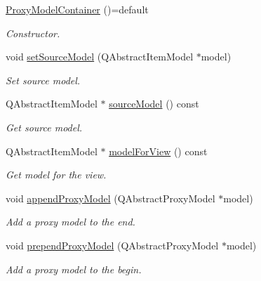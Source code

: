 \begin{DoxyCompactItemize}
\item 
\hyperlink{class_mdt_1_1_item_model_1_1_proxy_model_container_acef8f95b42382752a454b607bcf6d9b0}{Proxy\+Model\+Container} ()=default\hypertarget{class_mdt_1_1_item_model_1_1_proxy_model_container_acef8f95b42382752a454b607bcf6d9b0}{}\label{class_mdt_1_1_item_model_1_1_proxy_model_container_acef8f95b42382752a454b607bcf6d9b0}

\begin{DoxyCompactList}\small\item\em Constructor. \end{DoxyCompactList}\item 
void \hyperlink{class_mdt_1_1_item_model_1_1_proxy_model_container_a74f1afaa5c2002a6c0f7d31caed4fb2e}{set\+Source\+Model} (Q\+Abstract\+Item\+Model $\ast$model)
\begin{DoxyCompactList}\small\item\em Set source model. \end{DoxyCompactList}\item 
Q\+Abstract\+Item\+Model $\ast$ \hyperlink{class_mdt_1_1_item_model_1_1_proxy_model_container_ab77e422bbc3f5e2357a00e09909e75cc}{source\+Model} () const 
\begin{DoxyCompactList}\small\item\em Get source model. \end{DoxyCompactList}\item 
Q\+Abstract\+Item\+Model $\ast$ \hyperlink{class_mdt_1_1_item_model_1_1_proxy_model_container_ad7f8e95b0603b354a80bf4514db5a6e1}{model\+For\+View} () const 
\begin{DoxyCompactList}\small\item\em Get model for the view. \end{DoxyCompactList}\item 
void \hyperlink{class_mdt_1_1_item_model_1_1_proxy_model_container_a94a828852d4160371fc24ed05375e4b9}{append\+Proxy\+Model} (Q\+Abstract\+Proxy\+Model $\ast$model)
\begin{DoxyCompactList}\small\item\em Add a proxy model to the end. \end{DoxyCompactList}\item 
void \hyperlink{class_mdt_1_1_item_model_1_1_proxy_model_container_ab0bcb085825c4f8cca75b1f3a3cf66d8}{prepend\+Proxy\+Model} (Q\+Abstract\+Proxy\+Model $\ast$model)
\begin{DoxyCompactList}\small\item\em Add a proxy model to the begin. \end{DoxyCompactList}\item 

\end{DoxyCompactItemize}

